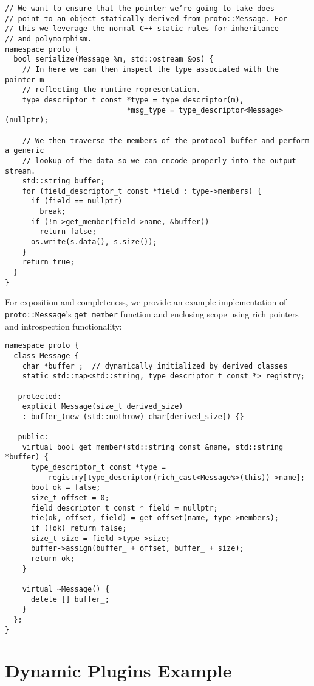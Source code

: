 \documentclass[10pt,a4paper]{article}
\begin{document}
\begin{verbatim}
// We want to ensure that the pointer we’re going to take does
// point to an object statically derived from proto::Message. For
// this we leverage the normal C++ static rules for inheritance
// and polymorphism.
namespace proto {
  bool serialize(Message %m, std::ostream &os) {
    // In here we can then inspect the type associated with the pointer m
    // reflecting the runtime representation.
    type_descriptor_t const *type = type_descriptor(m),
                            *msg_type = type_descriptor<Message>(nullptr);

    // We then traverse the members of the protocol buffer and perform a generic
    // lookup of the data so we can encode properly into the output stream.
    std::string buffer;
    for (field_descriptor_t const *field : type->members) {
      if (field == nullptr)
        break;
      if (!m->get_member(field->name, &buffer))
        return false;
      os.write(s.data(), s.size());
    }
    return true;
  }
}
\end{verbatim}

For exposition and completeness, we provide an example implementation of
\verb+proto::Message+’s \verb+get_member+ function and enclosing scope using
rich pointers and introspection functionality:

\begin{verbatim}
namespace proto {
  class Message {
    char *buffer_;  // dynamically initialized by derived classes
    static std::map<std::string, type_descriptor_t const *> registry;

   protected:
    explicit Message(size_t derived_size)
    : buffer_(new (std::nothrow) char[derived_size]) {}

   public:
    virtual bool get_member(std::string const &name, std::string *buffer) {
      type_descriptor_t const *type =
          registry[type_descriptor(rich_cast<Message%>(this))->name];
      bool ok = false;
      size_t offset = 0;
      field_descriptor_t const * field = nullptr;
      tie(ok, offset, field) = get_offset(name, type->members);
      if (!ok) return false;
      size_t size = field->type->size;
      buffer->assign(buffer_ + offset, buffer_ + size);
      return ok;
    }

    virtual ~Message() {
      delete [] buffer_;
    }
  };
}
\end{verbatim}

\section{Dynamic Plugins Example}
\label{appendix:plugins-example}
\end{document}
